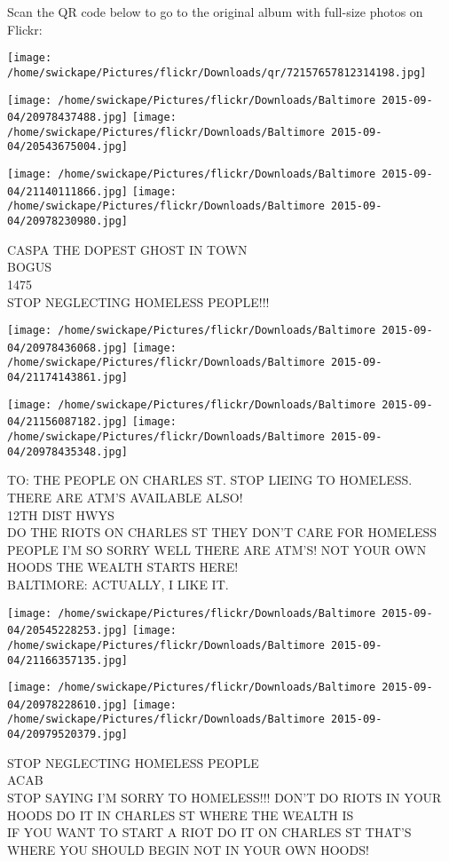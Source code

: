 \documentclass[10pt,letterpaper]{article}
\begin{document}
Scan the QR code below to go to the original album with full-size photos on Flickr:

\texttt{[image: /home/swickape/Pictures/flickr/Downloads/qr/72157657812314198.jpg]}
\pagebreak

\texttt{[image: /home/swickape/Pictures/flickr/Downloads/Baltimore 2015-09-04/20978437488.jpg]}
\texttt{[image: /home/swickape/Pictures/flickr/Downloads/Baltimore 2015-09-04/20543675004.jpg]}

\texttt{[image: /home/swickape/Pictures/flickr/Downloads/Baltimore 2015-09-04/21140111866.jpg]}
\texttt{[image: /home/swickape/Pictures/flickr/Downloads/Baltimore 2015-09-04/20978230980.jpg]}

CASPA THE DOPEST GHOST IN TOWN\\
BOGUS\\
1475\\
STOP NEGLECTING HOMELESS PEOPLE!!!
\pagebreak

\texttt{[image: /home/swickape/Pictures/flickr/Downloads/Baltimore 2015-09-04/20978436068.jpg]}
\texttt{[image: /home/swickape/Pictures/flickr/Downloads/Baltimore 2015-09-04/21174143861.jpg]}

\texttt{[image: /home/swickape/Pictures/flickr/Downloads/Baltimore 2015-09-04/21156087182.jpg]}
\texttt{[image: /home/swickape/Pictures/flickr/Downloads/Baltimore 2015-09-04/20978435348.jpg]}

TO: THE PEOPLE ON CHARLES ST. STOP LIEING TO HOMELESS.  THERE ARE ATM'S AVAILABLE ALSO!\\
12TH DIST HWYS\\
DO THE RIOTS ON CHARLES ST THEY DON'T CARE FOR HOMELESS PEOPLE I'M SO SORRY WELL THERE ARE ATM'S!  NOT YOUR OWN HOODS THE WEALTH STARTS HERE!\\
BALTIMORE: ACTUALLY, I LIKE IT.
\pagebreak

\texttt{[image: /home/swickape/Pictures/flickr/Downloads/Baltimore 2015-09-04/20545228253.jpg]}
\texttt{[image: /home/swickape/Pictures/flickr/Downloads/Baltimore 2015-09-04/21166357135.jpg]}

\texttt{[image: /home/swickape/Pictures/flickr/Downloads/Baltimore 2015-09-04/20978228610.jpg]}
\texttt{[image: /home/swickape/Pictures/flickr/Downloads/Baltimore 2015-09-04/20979520379.jpg]}

STOP NEGLECTING HOMELESS PEOPLE\\
ACAB\\
STOP SAYING I'M SORRY TO HOMELESS!!!  DON'T DO RIOTS IN YOUR HOODS DO IT IN CHARLES ST WHERE THE WEALTH IS\\
IF YOU WANT TO START A RIOT DO IT ON CHARLES ST THAT'S WHERE YOU SHOULD BEGIN NOT IN YOUR OWN HOODS!
\pagebreak
\end{document}
